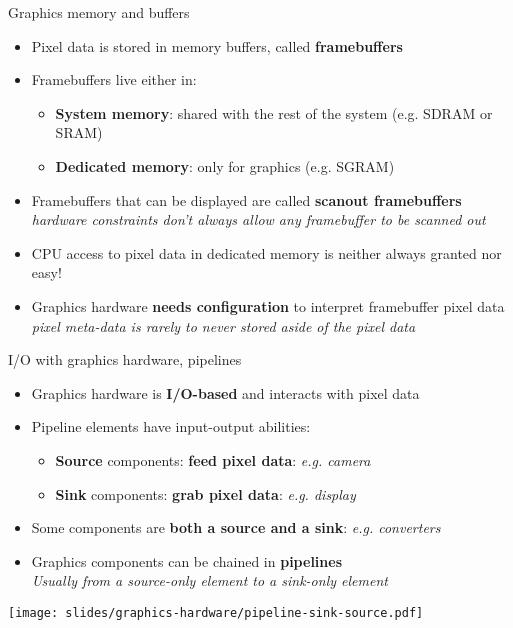 \begin{frame}{Graphics memory and buffers}
  \begin{itemize}
  \item Pixel data is stored in memory buffers, called \textbf{framebuffers}
  \item Framebuffers live either in:
    \begin{itemize}
    \item \textbf{System memory}: shared with the rest of the system (e.g. SDRAM or SRAM)
    \item \textbf{Dedicated memory}: only for graphics (e.g. SGRAM)
    \end{itemize}
  \item Framebuffers that can be displayed are called \textbf{scanout framebuffers}\\
  \textit{hardware constraints don't always allow any framebuffer to be scanned out}
  \item CPU access to pixel data in dedicated memory is neither always granted nor easy!
  \item Graphics hardware \textbf{needs configuration} to interpret framebuffer pixel data\\
    \textit{pixel meta-data is rarely to never stored aside of the pixel data}
  \end{itemize}
\end{frame}

\begin{frame}{I/O with graphics hardware, pipelines}
  \begin{itemize}
  \item Graphics hardware is \textbf{I/O-based} and interacts with pixel data
  \item Pipeline elements have input-output abilities:
    \begin{itemize}
    \item \textbf{Source} components: \textbf{feed pixel data}: \textit{e.g. camera}
    \item \textbf{Sink} components: \textbf{grab pixel data}: \textit{e.g. display}
    \end{itemize}
  \item Some components are \textbf{both a source and a sink}: \textit{e.g. converters}
  \item Graphics components can be chained in \textbf{pipelines}\\
    \textit{Usually from a source-only element to a sink-only element}
  \end{itemize}

  \vspace{-2em}
  \begin{center}
  \texttt{[image: slides/graphics-hardware/pipeline-sink-source.pdf]}
  \end{center}
\end{frame}

